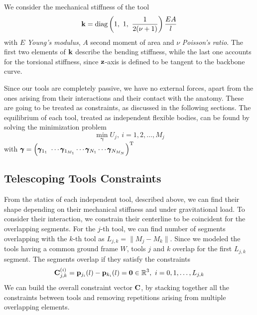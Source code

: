 We consider the mechanical stiffness of the tool
\begin{equation}
\mb k = \text{diag} \left(1, \ 1, \ \frac{1}{2(\nu + 1)} \right)\frac{E A}{l}
\end{equation}
with $E$ \emph{Young's modulus}, $A$ second moment of area and $\nu$ \emph{Poisson's ratio}. The first two elements of $\mathbf{k}$ describe the bending stiffness, while the last one accounts for the torsional stiffness, since $\mathbf{z}$-axis is defined to be tangent to the backbone curve.

Since our tools are completely passive, we have no external forces, apart from the ones arising from their interactions and their contact with the anatomy. These are going to be treated as constraints, as discussed in the following sections. The equilibrium of each tool, treated as independent flexible bodies, can be found by solving the minimization problem
\begin{equation}
\label{eq:single_solution}
    \min_{\pmb \gamma} U_j, \ i = 1, 2, \dots, M_j
\end{equation}
with $\pmb{\gamma} = \left(\pmb \gamma_{1_1} \ \cdots \pmb \gamma_{1_{M_1}} \cdots \pmb \gamma_{N_1} \cdots \pmb \gamma_{N_{M_N}} \right)\T$

\subsection{Telescoping Tools Constraints}
\label{sec:model:tools}
From the statics of each independent tool, described above, we can find their shape depending on their mechanical stiffness and under gravitational load. To consider their interaction, we constrain their centerline to be coincident for the overlapping segments. For the $j$-th tool, we can find number of segments overlapping with the $k$-th tool as $L_{j, k} = \|M_j - M_k\|$. Since we modeled the tools having a common ground frame $W$, tools $j$ and $k$ overlap for the first $L_{j, k}$ segment. The segments overlap if they satisfy the constraints
\begin{equation}
\label{eq:tele_constraints}
    \mathbf{C}^{(i)}_{j, k} = \mathbf{p}_{j_i}(l) - \mathbf{p}_{k_i}(l) = \mathbf{0} \in \mathbb{R}^3, \ i = 0, 1, \dots, L_{j, k}
\end{equation}
We can build the overall constraint vector $\mathbf{C}$, by stacking together all the constraints between tools and removing repetitions arising from multiple overlapping elements.

